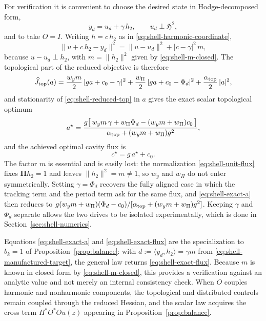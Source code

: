 \documentclass{article}
\newcommand{\HH}{\mathfrak H}
\newcommand{\Piop}{\boldsymbol\Pi}
\newcommand{\ip}[2]{\langle #1,#2\rangle}
\newcommand{\norm}[1]{\lVert #1\rVert}
\begin{document}
For verification it is convenient to choose the desired state in
Hodge-decomposed form,
\begin{equation}\label{eq:shell-manufactured-target}
  y_d=u_d+\gamma\,h_2,\qquad u_d\perp\HH^2,
\end{equation}
and to take $O=I$. Writing $h=c\,h_2$ as in
\eqref{eq:shell-harmonic-coordinate},
\[
  \norm{u+c\,h_2-y_d}^2=\norm{u-u_d}^2+|c-\gamma|^2\,m ,
\]
because $u-u_d\perp h_2$, with $m=\norm{h_2}^2$ given by
\eqref{eq:shell-m-closed}. The topological part of the reduced
objective is therefore
\begin{equation}\label{eq:shell-reduced-top}
  \widehat J_{\rm top}(a)
  =\frac{w_y m}{2}\,|g a+c_0-\gamma|^2
   +\frac{w_\Pi}{2}\,|g a+c_0-\Phi_d|^2
   +\frac{\alpha_{\rm top}}{2}\,|a|^2 ,
\end{equation}
and stationarity of \eqref{eq:shell-reduced-top} in $a$ gives the exact
scalar topological optimum
\begin{equation}\label{eq:shell-exact-a}
  a^\star=\frac{g\bigl[\,w_y m\,\gamma+w_\Pi\Phi_d
      -(w_y m+w_\Pi)c_0\,\bigr]}
     {\alpha_{\rm top}+(w_y m+w_\Pi)g^2},
\end{equation}
and the achieved optimal cavity flux is
\begin{equation}\label{eq:shell-exact-flux}
  c^\star=g\,a^\star+c_0 .
\end{equation}
The factor $m$ is essential and is easily lost: the normalization
\eqref{eq:shell-unit-flux} fixes $\Piop h_2=1$ and leaves
$\norm{h_2}^2=m\neq1$, so $w_y$ and $w_\Pi$ do not enter symmetrically.
Setting $\gamma=\Phi_d$ recovers the fully aligned case in which the
tracking term and the period term ask for the same flux, and
\eqref{eq:shell-exact-a} then reduces to
$g(w_ym+w_\Pi)(\Phi_d-c_0)/[\alpha_{\rm top}+(w_ym+w_\Pi)g^2]$.
Keeping $\gamma$ and $\Phi_d$ separate allows the two drives to be
isolated experimentally, which is done in
Section~\ref{sec:shell-numerics}.
 
Equations \eqref{eq:shell-exact-a} and \eqref{eq:shell-exact-flux} are the specialization to $b_k=1$ of Proposition~\ref{prop:balance}: with
$d:=\ip{y_d}{h_2}=\gamma m$ from
\eqref{eq:shell-manufactured-target}, the general law returns
\eqref{eq:shell-exact-flux}. Because $m$ is known in closed form by
\eqref{eq:shell-m-closed}, this provides a verification against an
analytic value and not merely an internal consistency check.  When $O$ couples harmonic and nonharmonic components, the topological and
distributed controls remain coupled through the reduced Hessian, and the
scalar law acquires the cross term $H^{*}O^{*}Ou(z)$ appearing in
Proposition~\ref{prop:balance}.
 
\end{document}
